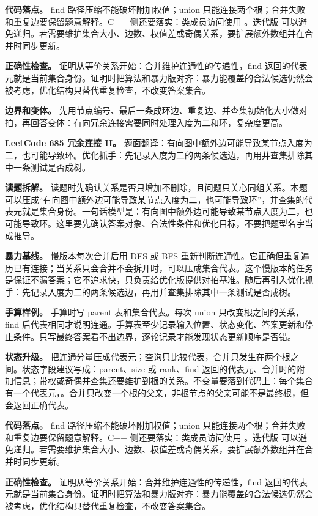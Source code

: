 \textbf{代码落点。} find 路径压缩不能破坏附加权值；union 只能连接两个根；合并失败和重复边要保留题意解释。C++ 侧还要落实：类成员访问使用 。迭代版  可以避免递归。若需要维护集合大小、边数、权值差或奇偶关系，要扩展额外数组并在合并时同步更新。

\textbf{正确性检查。} 证明从等价关系开始：合并维护连通性的传递性，find 返回的代表元就是当前集合身份。证明时把算法和暴力版对齐：暴力能覆盖的合法候选仍然会被考虑，优化结构只替代重复检查，不改变答案集合。

\textbf{边界和变体。} 先用节点编号、最后一条成环边、重复边、并查集初始化大小做对拍，再回答变体：有向冗余连接需要同时处理入度为二和环，复杂度更高。

\noindent\textbf{LeetCode 685 冗余连接 II。} 题面翻译：有向图中额外边可能导致某节点入度为二，也可能导致环。优化抓手：先记录入度为二的两条候选边，再用并查集排除其中一条测试是否成树。

\textbf{读题拆解。} 读题时先确认关系是否只增加不删除，且问题只关心同组关系。本题可以压成“有向图中额外边可能导致某节点入度为二，也可能导致环”，并查集的代表元就是集合身份。一句话模型是：有向图中额外边可能导致某节点入度为二，也可能导致环。这里要先确认答案对象、合法性条件和优化目标，不要把题型名字当成推导。

\textbf{暴力基线。} 慢版本每次合并后用 DFS 或 BFS 重新判断连通性。它正确但重复遍历已有连接；当关系只会合并不会拆开时，可以压成集合代表。这个慢版本的任务是保证不漏答案；它不追求快，只负责给优化版提供对拍基准。随后再引入优化抓手：先记录入度为二的两条候选边，再用并查集排除其中一条测试是否成树。

\textbf{手算样例。} 手算时写 parent 表和集合代表。每次 union 只改变根之间的关系，find 后代表相同才说明连通。手算表至少记录输入位置、状态变化、答案更新和停止条件。只写最终答案看不出边界，逐轮记录才能发现状态更新顺序是否错。

\textbf{状态升级。} 把连通分量压成代表元；查询只比较代表，合并只发生在两个根之间。状态字段建议写成：parent、size 或 rank、find 返回的代表元、合并时的附加信息；带权或奇偶并查集还要维护到根的关系。不变量要落到代码上：每个集合有一个代表元，。合并只改变一个根的父亲，非根节点的父亲可能不是最终根，但  会返回正确代表。

\textbf{代码落点。} find 路径压缩不能破坏附加权值；union 只能连接两个根；合并失败和重复边要保留题意解释。C++ 侧还要落实：类成员访问使用 。迭代版  可以避免递归。若需要维护集合大小、边数、权值差或奇偶关系，要扩展额外数组并在合并时同步更新。

\textbf{正确性检查。} 证明从等价关系开始：合并维护连通性的传递性，find 返回的代表元就是当前集合身份。证明时把算法和暴力版对齐：暴力能覆盖的合法候选仍然会被考虑，优化结构只替代重复检查，不改变答案集合。

